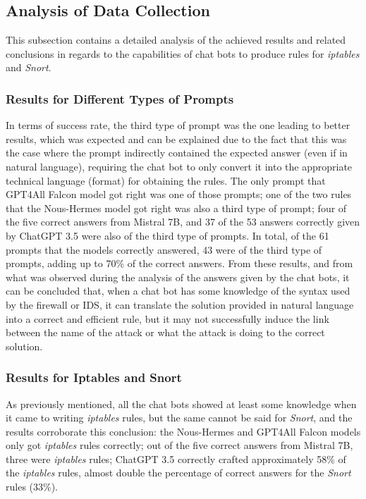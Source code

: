 \documentclass[sigconf]{acmart}
\begin{document}
\subsection{Analysis of Data Collection}
This subsection contains a detailed analysis of the achieved results and related conclusions in regards to the capabilities of chat bots to produce rules for \textit{iptables} and \textit{Snort}.

\subsubsection{Results for Different Types of Prompts}
In terms of success rate, the third type of prompt was the one leading to better results, which was expected and can be explained due to the fact that this was the case where the prompt indirectly contained the expected answer (even if in natural language), requiring the chat bot to only convert it into the appropriate technical language (format) for obtaining the rules. The only prompt that GPT4All Falcon model got right was one of those prompts; one of the two rules that the Nous-Hermes model got right was also a third type of prompt; four of the five correct answers from Mistral 7B, and 37 of the 53 answers correctly given by ChatGPT 3.5 were also of the third type of prompts. In total, of the 61 prompts that the models correctly answered, 43 were of the third type of prompts, adding up to 70\% of the correct answers. From these results, and from what was observed during the analysis of the answers given by the chat bots, it can be concluded that, when a chat bot has some knowledge of the syntax used by the firewall or IDS, it can translate the solution provided in natural language into a correct and efficient rule, but it may not successfully induce the link between the name of the attack or what the attack is doing to the correct solution.

\subsubsection{Results for Iptables and Snort}
As previously mentioned, all the chat bots showed at least some knowledge when it came to writing \textit{iptables} rules, but the same cannot be said for \textit{Snort}, and the results corroborate this conclusion: the Nous-Hermes and GPT4All Falcon models only got \textit{iptables} rules correctly; out of the five correct answers from Mistral 7B, three were \textit{iptables} rules; ChatGPT 3.5 correctly crafted approximately 58\% of the \textit{iptables} rules, almost double the percentage of correct answers for the \textit{Snort} rules (33\%).
\end{document}
